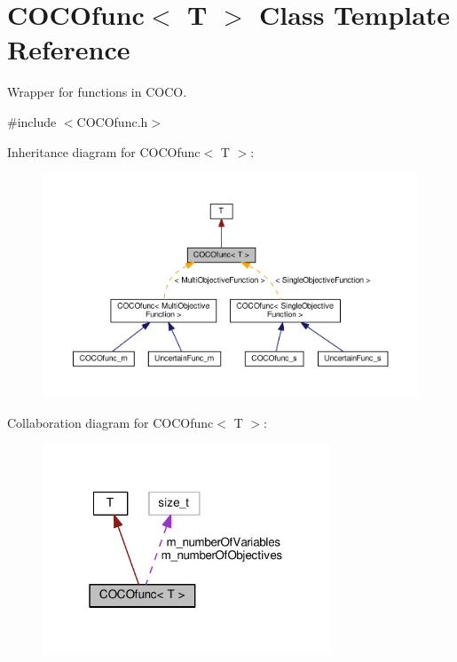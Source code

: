 \hypertarget{classCOCOfunc}{}\section{C\+O\+C\+Ofunc$<$ T $>$ Class Template Reference}
\label{classCOCOfunc}


Wrapper for functions in C\+O\+CO.  




{\ttfamily \#include $<$C\+O\+C\+Ofunc.\+h$>$}



Inheritance diagram for C\+O\+C\+Ofunc$<$ T $>$\+:\nopagebreak
\begin{figure}[H]
\begin{center}
\leavevmode
\includegraphics[width=350pt]{classCOCOfunc__inherit__graph}
\end{center}
\end{figure}


Collaboration diagram for C\+O\+C\+Ofunc$<$ T $>$\+:\nopagebreak
\begin{figure}[H]
\begin{center}
\leavevmode
\includegraphics[width=244pt]{classCOCOfunc__coll__graph}
\end{center}
\end{figure}
